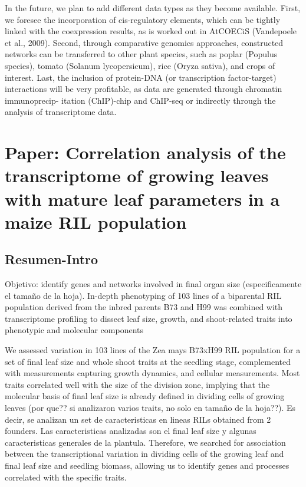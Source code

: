 \documentclass[a4paper,10pt]{article}
\begin{document}
\begin{itemize}
In the future, we plan to add different data types as they become available. 
First, we foresee the incorporation of cis-regulatory elements, which can be tightly linked with the coexpression results, as is worked
out in AtCOECiS (Vandepoele et al., 2009). Second, through comparative genomics approaches, constructed networks can be transferred to other plant species, such as poplar (Populus species), tomato (Solanum lycopersicum), rice (Oryza sativa), and crops of interest.
Last, the inclusion of protein-DNA (or transcription factor-target) interactions will be very profitable, as data are generated through chromatin immunoprecip-
itation (ChIP)-chip and ChIP-seq or indirectly through the analysis of transcriptome data.
 
\end{itemize}






\section{Paper: Correlation analysis of the transcriptome of growing leaves with mature leaf parameters in a maize RIL population}
\subsection{Resumen-Intro}
Objetivo: identify genes and networks involved in final organ size (especificamente el tamaño de la hoja).
In-depth phenotyping of 103 lines of a biparental RIL population derived from the inbred parents B73 and H99  was combined with transcriptome profiling to dissect leaf size, growth, and shoot-related traits into phenotypic and molecular components

We assessed variation in 103 lines of the Zea mays B73xH99 RIL population for a set of final leaf size and whole shoot traits at the seedling stage, complemented with measurements capturing growth
dynamics, and cellular measurements. 
Most traits correlated well with the size of the division zone, implying that the molecular basis of final leaf size is already defined in dividing cells of growing leaves (por que?? si analizaron varios traits, no solo en tamaño de la hoja??).
Es decir, se analizan un set de caracteristicas en lineas RILs obtained from 2 founders. Las caracteristicas analizadas son el final leaf size y algunas caracteristicas generales de la plantula.
Therefore, we searched for association between the transcriptional variation in dividing cells of the growing leaf and final
leaf size and seedling biomass, allowing us to identify genes and processes correlated with the specific traits.
\end{document}
